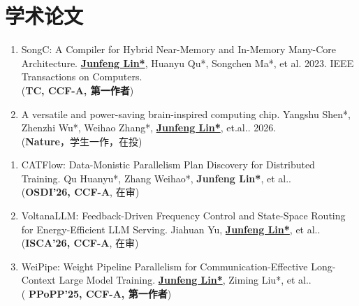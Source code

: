 \documentclass{resume}
\begin{document}

\section{学术论文}

\begin{enumerate}

    \item {SongC: A Compiler for Hybrid Near-Memory and In-Memory Many-Core Architecture. 
    \textbf{\underline{Junfeng Lin*}}, Huanyu Qu*, Songchen Ma*, et al. 2023. IEEE Transactions on Computers}. \\ (\textbf{TC, CCF-A, 第一作者})

    \item {A versatile and power-saving brain-inspired computing chip. Yangshu Shen*, Zhenzhi Wu*, Weihao Zhang*, \textbf{\underline{Junfeng Lin*}}, et.al.. 2026.}\\
    (\textbf{Nature}，学生一作，在投)

\end{enumerate}

\begin{enumerate}
    \item {CATFlow: Data-Monistic Parallelism Plan Discovery for Distributed Training}. Qu Huanyu*, Zhang Weihao*, \textbf{Junfeng Lin*}, et al.. \\(\textbf{OSDI'26, CCF-A}, 在审)
    \item {VoltanaLLM: Feedback-Driven Frequency Control and State-Space Routing for Energy-Efficient LLM Serving.
    Jiahuan Yu, \textbf{ \underline{Junfeng Lin*}}, et al.}. \\(\textbf{ISCA'26, CCF-A}, 在审)
    

    \item {WeiPipe: Weight Pipeline Parallelism for Communication-Effective Long-Context Large Model Training.
    \textbf{\underline{Junfeng Lin*}}, Ziming Liu*, et al.}. \\( \textbf{PPoPP'25, CCF-A, 第一作者})
\end{enumerate}
    
\end{document}

